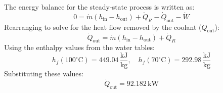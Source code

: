 The energy balance for the steady-state process is written as:  
\[
0 = \dot{m} (h_{\text{in}} - h_{\text{out}}) + \dot{Q}_R - \dot{Q}_{\text{out}} - \dot{W}
\]  
Rearranging to solve for the heat flow removed by the coolant (\( \dot{Q}_{\text{out}} \)):  
\[
\dot{Q}_{\text{out}} = \dot{m} (h_{\text{in}} - h_{\text{out}}) + \dot{Q}_R
\]  
Using the enthalpy values from the water tables:  
\[
h_f(100^\circ\text{C}) = 449.04 \, \frac{\text{kJ}}{\text{kg}}, \quad h_f(70^\circ\text{C}) = 292.98 \, \frac{\text{kJ}}{\text{kg}}
\]  
Substituting these values:  
\[
\dot{Q}_{\text{out}} = 92.182 \, \text{kW}
\]